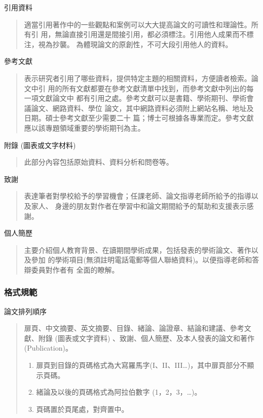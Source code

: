 \documentclass[
    writingLanguage=chinese, %
    addPageTitle=on,  %
    addDeclaration=on, %
    addMUSTlog=off, %
    addFigTOC=on, %
    addTabTOC=on, %
    refIndent=off, %
    printMod=off, %
]{must}
\begin{document}
\noindent\faHandORight 引用資料
\begin{quote}
適當引用著作中的一些觀點和案例可以大大提高論文的可讀性和理論性。所有引
用，無論直接引用還是間接引用，都必須標注。引用他人成果而不標注，視為抄襲。
為體現論文的原創性，不可大段引用他人的資料。

\end{quote}

\noindent\faHandORight 參考文獻
\begin{quote}
表示研究者引用了哪些資料，提供特定主題的相關資料，方便讀者檢索。論文中引
用的所有文獻都要在參考文獻清單中找到，而參考文獻中列出的每一項文獻論文中
都有引用之處。參考文獻可以是書籍、學術期刊、學術會議論文、網路資料、學位
論文，其中網路資料必須附上網站名稱、地址及日期。碩士參考文獻至少需要二十
篇；博士可根據各專業而定。參考文獻應以該專題領域重要的學術期刊為主。

\end{quote}



\noindent\faHandORight 附錄 (圖表或文字材料)
\begin{quote}
此部分內容包括原始資料、資料分析和問卷等。

\end{quote}



\noindent\faHandORight 致謝
\begin{quote}
表達筆者對學校給予的學習機會；任課老師、論文指導老師所給予的指導以及家人、
身邊的朋友對作者在學習中和論文期間給予的幫助和支援表示感謝。
\end{quote}



\noindent\faHandORight 個人簡歷
\begin{quote}
主要介紹個人教育背景、在讀期間學術成果，包括發表的學術論文、著作以及參加
的學術項目(無須註明電話電郵等個人聯絡資料)。以便指導老師和答辯委員對作者有
全面的瞭解。
\end{quote}



\subsubsection{格式規範}

\noindent\faHandORight 論文排列順序
\begin{quote}
扉頁、中文摘要、英文摘要、目錄、緒論、論證章、結論和建議、參考文獻、附錄
(圖表或文字資料) 、致謝、個人簡歷、及本人發表的論文和著作 (Publication)。

\begin{enumerate}
    \item 扉頁到目錄的頁碼格式為大寫羅馬字(I、II、III…)，其中扉頁部分不顯示頁碼。
    \item 緒論及以後的頁碼格式為阿拉伯數字 (1，2，3，…)。
    \item 頁碼置於頁尾處，對齊置中。
\end{enumerate}

\end{quote}
\end{document}
